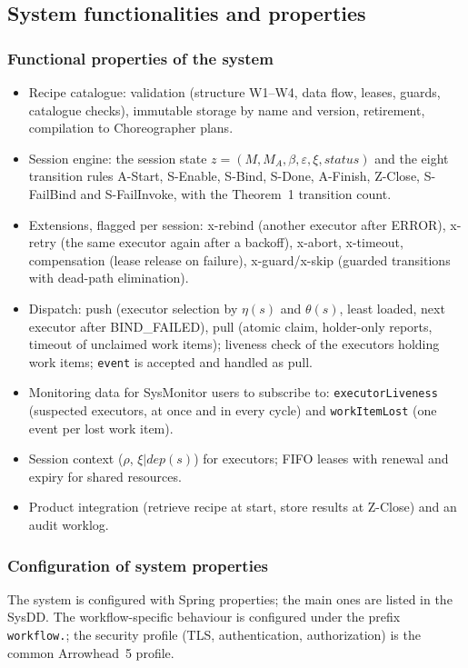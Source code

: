 \documentclass[a4paper]{arrowhead}
\begin{document}
\subsection{System functionalities and properties}
\label{sec:properties}
\subsubsection{Functional properties of the system}
\begin{itemize}
\item Recipe catalogue: validation (structure W1--W4, data flow, leases, guards, catalogue checks), immutable storage by
name and version, retirement, compilation to Choreographer plans.
\item Session engine: the session state $z = (M, M_A, \beta, \varepsilon, \xi, status)$ and the eight transition rules
A-Start, S-Enable, S-Bind, S-Done, A-Finish, Z-Close, S-FailBind and S-FailInvoke, with the Theorem~1 transition count.
\item Extensions, flagged per session: x-rebind (another executor after ERROR), x-retry (the same executor again after a
backoff), x-abort, x-timeout, compensation (lease release on failure), x-guard/x-skip (guarded transitions with dead-path elimination).
\item Dispatch: push (executor selection by $\eta(s)$ and $\theta(s)$, least loaded, next executor after BIND\_FAILED),
pull (atomic claim, holder-only reports, timeout of unclaimed work items); liveness check of the executors holding
work items; \texttt{event} is accepted and handled as pull.
\item Monitoring data for SysMonitor users to subscribe to: \texttt{executor\allowbreak{}Liveness} (suspected executors, at once and
in every cycle) and \texttt{workItemLost} (one event per lost work item).
\item Session context ($\rho$, $\xi|dep(s)$) for executors; FIFO leases with renewal and expiry for shared resources.
\item Product integration (retrieve recipe at start, store results at Z-Close) and an audit worklog.
\end{itemize}

\subsubsection{Configuration of system properties}
The system is configured with Spring properties; the main ones are listed in the SysDD. The workflow-specific behaviour
is configured under the prefix \texttt{workflow.}; the security profile (TLS, authentication, authorization) is the
common Arrowhead~5 profile.
\end{document}

